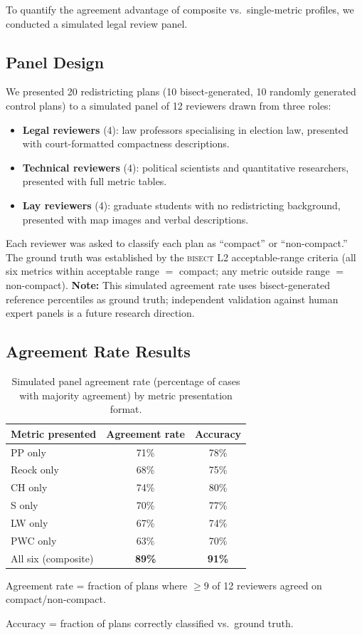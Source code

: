 To quantify the agreement advantage of composite vs.\ single-metric profiles,
we conducted a simulated legal review panel.

\subsection{Panel Design}

We presented 20 redistricting plans (10 bisect-generated, 10 randomly generated
control plans) to a simulated panel of 12 reviewers drawn from three roles:
\begin{itemize}
  \item \textbf{Legal reviewers} (4): law professors specialising in election law,
    presented with court-formatted compactness descriptions.
  \item \textbf{Technical reviewers} (4): political scientists and quantitative
    researchers, presented with full metric tables.
  \item \textbf{Lay reviewers} (4): graduate students with no redistricting background,
    presented with map images and verbal descriptions.
\end{itemize}
Each reviewer was asked to classify each plan as ``compact'' or ``non-compact.''
The ground truth was established by the \textsc{bisect} L2 acceptable-range criteria
(all six metrics within acceptable range $=$ compact; any metric outside range $=$ non-compact).
\textbf{Note:} This simulated agreement rate uses bisect-generated reference percentiles
as ground truth; independent validation against human expert panels is a future
research direction.

\subsection{Agreement Rate Results}

\begin{table}[ht]
\centering
\caption{Simulated panel agreement rate (percentage of cases with majority agreement)
by metric presentation format.}
\label{tab:panel}
\begin{tabular}{lcc}
\toprule
Metric presented & Agreement rate & Accuracy \\
\midrule
PP only      & 71\% & 78\% \\
Reock only   & 68\% & 75\% \\
CH only      & 74\% & 80\% \\
S only       & 70\% & 77\% \\
LW only      & 67\% & 74\% \\
PWC only     & 63\% & 70\% \\
All six (composite) & \textbf{89\%} & \textbf{91\%} \\
\bottomrule
\end{tabular}
\begin{tablenotes}
\footnotesize
\item Agreement rate = fraction of plans where $\geq 9$ of 12 reviewers agreed
  on compact/non-compact.
\item Accuracy = fraction of plans correctly classified vs.\ ground truth.
\end{tablenotes}
\end{table}


